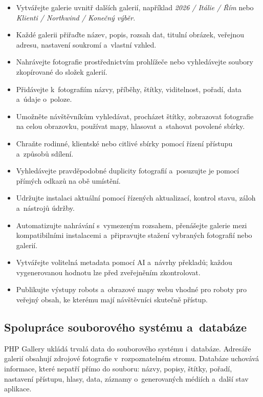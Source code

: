 \documentclass[11pt,a4paper]{article}
\begin{document}
\begin{itemize}
  \item Vytvářejte galerie uvnitř dalších galerií, například \emph{2026 / Itálie
  / Řím} nebo \emph{Klienti / Northwind / Konečný výběr}.
  \item Každé galerii přiřaďte název, popis, rozsah dat, titulní obrázek,
  veřejnou adresu, nastavení soukromí a~vlastní vzhled.
  \item Nahrávejte fotografie prostřednictvím prohlížeče nebo vyhledávejte
  soubory zkopírované do složek galerií.
  \item Přidávejte k~fotografiím názvy, příběhy, štítky, viditelnost, pořadí,
  data a~údaje o~poloze.
  \item Umožněte návštěvníkům vyhledávat, procházet štítky, zobrazovat
  fotografie na celou obrazovku, používat mapy, hlasovat a~stahovat povolené
  sbírky.
  \item Chraňte rodinné, klientské nebo citlivé sbírky pomocí řízení přístupu
  a~způsobů sdílení.
  \item Vyhledávejte pravděpodobné duplicity fotografií a~posuzujte je pomocí
  přímých odkazů na obě umístění.
  \item Udržujte instalaci aktuální pomocí řízených aktualizací, kontrol stavu,
  záloh a~nástrojů údržby.
  \item Automatizujte nahrávání s~vymezeným rozsahem, přenášejte galerie mezi
  kompatibilními instalacemi a~připravujte stažení vybraných fotografií nebo
  galerií.
  \item Vytvářejte volitelná metadata pomocí AI a~návrhy překladů; každou
  vygenerovanou hodnotu lze před zveřejněním zkontrolovat.
  \item Publikujte výstupy robots a~obrazové mapy webu vhodné pro roboty pro
  veřejný obsah, ke kterému mají návštěvníci skutečně přístup.
\end{itemize}

\subsection{Spolupráce souborového systému a~databáze}

PHP Gallery ukládá trvalá data do souborového systému i~databáze. Adresáře
galerií obsahují zdrojové fotografie v~rozpoznatelném stromu. Databáze uchovává
informace, které nepatří přímo do souboru: názvy, popisy, štítky, pořadí,
nastavení přístupu, hlasy, data, záznamy o~generovaných médiích a~další stav
aplikace.
\end{document}

